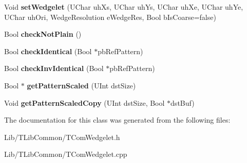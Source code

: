 \begin{DoxyCompactItemize}
\item 
\mbox{\label{class_t_com_wedgelet_acf22831bd4579ddb1f886e9728efe4b2}} 
Void {\bfseries set\+Wedgelet} (U\+Char uh\+Xs, U\+Char uh\+Ys, U\+Char uh\+Xe, U\+Char uh\+Ye, U\+Char uh\+Ori, Wedge\+Resolution e\+Wedge\+Res, Bool b\+Is\+Coarse=false)
\item 
\mbox{\label{class_t_com_wedgelet_ac99f713fad47b71122de5136be010ee2}} 
Bool {\bfseries check\+Not\+Plain} ()
\item 
\mbox{\label{class_t_com_wedgelet_aec5eb376617b15bdc178d6dbb17d9c33}} 
Bool {\bfseries check\+Identical} (Bool $\ast$pb\+Ref\+Pattern)
\item 
\mbox{\label{class_t_com_wedgelet_a5bfbbe2d5948888d933ea12fd6a80a00}} 
Bool {\bfseries check\+Inv\+Identical} (Bool $\ast$pb\+Ref\+Pattern)
\item 
\mbox{\label{class_t_com_wedgelet_a93f066779a1cc6f561fdca860bc827bf}} 
Bool $\ast$ {\bfseries get\+Pattern\+Scaled} (U\+Int dst\+Size)
\item 
\mbox{\label{class_t_com_wedgelet_adacffb231889cffb3db1949de6e6f405}} 
Void {\bfseries get\+Pattern\+Scaled\+Copy} (U\+Int dst\+Size, Bool $\ast$dst\+Buf)
\end{DoxyCompactItemize}


The documentation for this class was generated from the following files\+:\begin{DoxyCompactItemize}
\item 
Lib/\+T\+Lib\+Common/T\+Com\+Wedgelet.\+h\item 
Lib/\+T\+Lib\+Common/T\+Com\+Wedgelet.\+cpp\end{DoxyCompactItemize}
